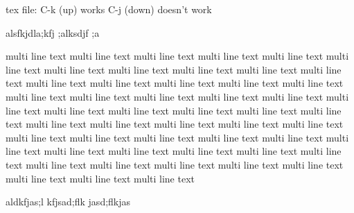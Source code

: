 

tex file:
  C-k (up)   works
  C-j (down) doesn't work

alsfkjdla;kfj ;alksdjf ;a



multi line text multi line text multi line text multi line text multi line text multi line text multi line text multi line text multi line text multi line text multi line text multi line text multi line text multi line text multi line text multi line text multi line text multi line text multi line text multi line text multi line text multi line text multi line text multi line text multi line text multi line text multi line text multi line text multi line text multi line text multi line text multi line text multi line text multi line text multi line text multi line text multi line text multi line text multi line text multi line text multi line text multi line text multi line text multi line text multi line text multi line text multi line text multi line text multi line text multi line text multi line text 




aldkfjas;l kfjsad;flk jasd;flkjas 
